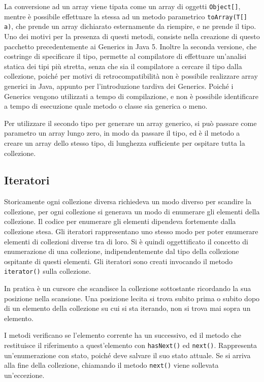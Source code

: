 \documentclass{article}
\numberwithin{equation}{subsection}
\begin{document}
La conversione ad un array viene tipata come un array di oggetti \verb|Object[]|, mentre è possibile effettuare la stessa ad un metodo parametrico \verb|toArray(T[] a)|, che 
prende un array dichiarato esternamente da riempire, e ne prende il tipo. 
Uno dei motivi per la presenza di questi metodi, consiste nella creazione di questo pacchetto precedentemente ai Generics in Java 5. Inoltre la seconda versione, che costringe di 
specificare il tipo, permette al compilatore di effettuare un'analisi statica dei tipi più stretta, senza che sia il compilatore a cercare il tipo dalla collezione, poiché 
per motivi di retrocompatibilità non è possibile realizzare array generici in Java, appunto per l'introduzione tardiva dei Generics. Poiché i Generics vengono utilizzati a 
tempo di compilazione, e non è possibile identificare a tempo di esecuzione quale metodo o classe sia generica o meno. 

Per utilizzare il secondo tipo per generare un array generico, si può passare come parametro un array lungo zero, in modo da passare il tipo, ed è il metodo a creare un array 
dello stesso tipo, di lunghezza sufficiente per ospitare tutta la collezione. 

\subsection{Iteratori}

Storicamente ogni collezione diversa richiedeva un modo diverso per scandire la collezione, per ogni collezione si generava un modo di enumerare gli elementi della collezione. 
Il codice per enumerare gli elementi dipendeva fortemente dalla collezione stesa. Gli iteratori rappresentano uno stesso modo per poter enumerare elementi di collezioni diverse 
tra di loro. 
Si è quindi oggettificato il concetto di enumerazione di una collezione, indipendentemente dal tipo della collezione ospitante di questi elementi. Gli iteratori 
sono creati invocando il metodo \verb|iterator()| sulla collezione. 

In pratica è un cursore che scandisce la collezione sottostante ricordando la sua posizione nella scansione. Una posizione lecita si trova subito prima o subito dopo di un 
elemento della collezione su cui si sta iterando, non si trova mai sopra un elemento. 

I metodi verificano se l'elemento corrente ha un successivo, ed il metodo che restituisce il riferimento a quest'elemento con \verb|hasNext()| ed \verb|next()|. 
Rappresenta un'enumerazione con stato, poiché deve salvare il suo stato attuale. Se si arriva alla fine della collezione, chiamando il metodo \verb|next()| viene 
sollevata un'eccezione. 
\end{document}
